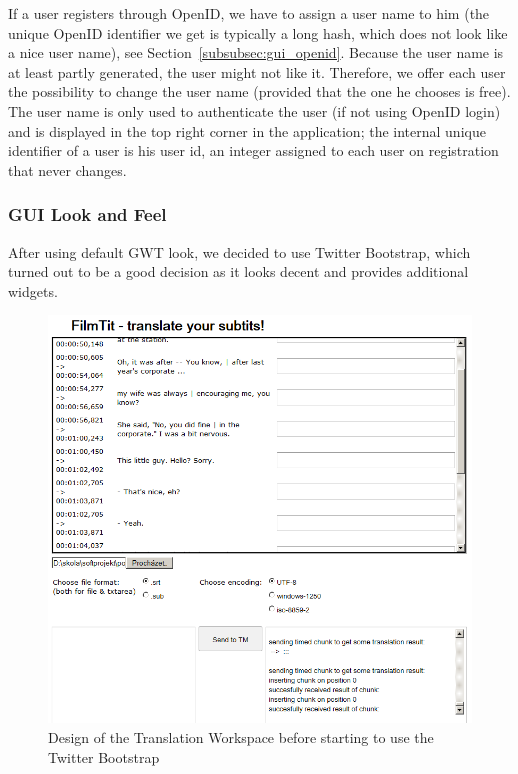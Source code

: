 {If a user registers through OpenID, we have to assign a user name to him (the unique OpenID identifier we get is typically a long hash, which does not look like a nice user name), see Section~\ref{subsubsec:gui_openid}. Because the user name is at least partly generated, the user might not like it. Therefore, we offer each user the possibility to change the user name (provided that the one he chooses is free). The user name is only used to authenticate the user (if not using OpenID login) and is displayed in the top right corner in the application; the internal unique identifier of a user is his user id, an integer assigned to each user on registration that never changes.

\subsubsection{GUI Look and Feel}

After using default GWT look, we decided to use Twitter Bootstrap, which turned out to be a good decision as it looks decent and provides additional widgets.

\begin{figure}
\begin{center}
\includegraphics[scale=0.5]{figures/old_screenshot.png}
\end{center}
\caption{Design of the Translation Workspace before starting to use the Twitter Bootstrap}
\label{fig:before_bootstrap}
\end{figure}

}
